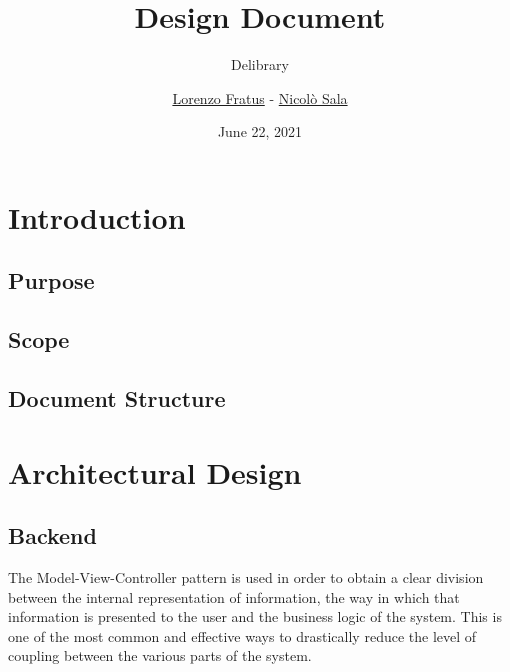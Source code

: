 
\graphicspath{ {assets/} }

\title{Design Document}
\subtitle{Delibrary}
\author{\href{https://github.com/lorenzofratus}{Lorenzo Fratus} - \href{https://github.com/nicheosala}{Nicolò Sala}}
\date{June 22, 2021}



\maketitle

\tableofcontents



\chapter{Introduction}

\section{Purpose}

\section{Scope}

\section{Document Structure}



\chapter{Architectural Design}

\section{Backend}

The Model-View-Controller pattern is used in order to obtain a clear division between the internal representation of information, the way in which that information is presented to the user and the business logic of the system.
This is one of the most common and effective ways to drastically reduce the level of coupling between the various parts of the system.

